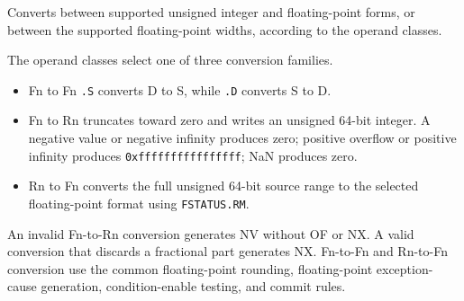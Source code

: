 Converts between supported unsigned integer and floating-point forms, or between the supported floating-point widths, according to the operand classes.

The operand classes select one of three conversion families.

\begin{itemize}
\item Fn to Fn \texttt{.S} converts D to S, while \texttt{.D} converts S to D.
\item Fn to Rn truncates toward zero and writes an unsigned 64-bit integer. A negative value or negative infinity
produces zero; positive overflow or positive infinity produces \texttt{0xffffffffffffffff}; NaN produces zero.
\item Rn to Fn converts the full unsigned 64-bit source range to the selected floating-point format using
\texttt{FSTATUS.RM}.
\end{itemize}
An invalid Fn-to-Rn conversion generates NV without OF or NX. A valid conversion that discards a fractional part
generates NX. Fn-to-Fn and Rn-to-Fn conversion use the common floating-point rounding, floating-point
exception-cause generation, condition-enable testing, and commit rules.
